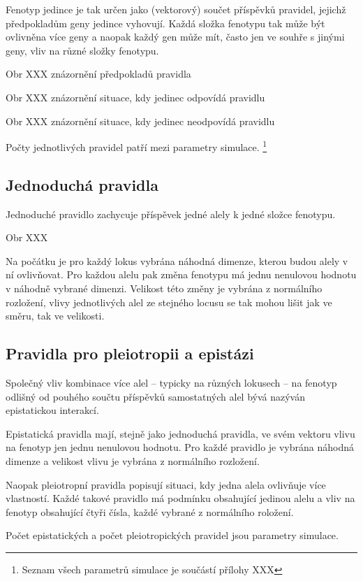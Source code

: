 Fenotyp jedince je tak určen jako (vektorový) součet příspěvků pravidel,
jejichž předpokladům geny jedince vyhovují. Každá složka fenotypu tak může být ovlivněna více geny a naopak
každý gen může mít, často jen ve souhře s jinými geny, vliv na různé složky fenotypu.

Obr XXX znázornění předpokladů pravidla

Obr XXX znázornění situace, kdy jedinec odpovídá pravidlu

Obr XXX znázornění situace, kdy jedinec neodpovídá pravidlu

Počty jednotlivých pravidel patří mezi parametry simulace.
\footnote{Seznam všech parametrů simulace je součástí přílohy XXX}

\subsection{Jednoduchá pravidla}

Jednoduché pravidlo zachycuje příspěvek jedné alely k jedné složce fenotypu.

Obr XXX

Na počátku je pro každý lokus vybrána náhodná dimenze, kterou budou alely v ní ovlivňovat. Pro každou alelu pak změna
fenotypu má jednu nenulovou hodnotu v náhodně vybrané dimenzi. Velikost této změny je vybrána z normálního rozložení,
vlivy jednotlivých alel ze stejného locusu se tak mohou lišit jak ve směru, tak ve velikosti.

\subsection{Pravidla pro pleiotropii a epistázi}

Společný vliv kombinace více alel -- typicky na různých lokusech -- na fenotyp odlišný od pouhého součtu příspěvků samostatných alel bývá nazýván epistatickou interakcí.

Epistatická pravidla mají, stejně jako jednoduchá pravidla, ve svém vektoru vlivu na fenotyp jen jednu nenulovou hodnotu. Pro každé pravidlo je vybrána náhodná dimenze a velikost vlivu je vybrána z normálního rozložení.

Naopak pleiotropní pravidla popisují situaci, kdy jedna alela ovlivňuje více vlastností. Každé takové pravidlo má podmínku obsahující jedinou alelu a vliv na fenotyp obsahující čtyři čísla, každé vybrané z normálního roložení.

Počet epistatických a počet pleiotropických pravidel jsou parametry simulace.

